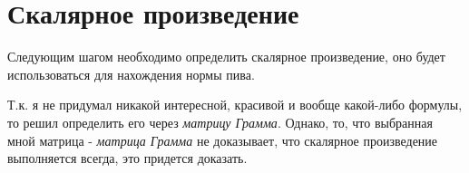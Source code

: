 \section*{Скалярное произведение}
Следующим шагом необходимо определить скалярное произведение, оно будет использоваться для нахождения нормы пива.

Т.к. я не придумал никакой интересной, красивой и вообще какой-либо формулы, то решил определить его через \textit{матрицу Грамма}. Однако, то, что выбранная мной матрица - \textit{матрица Грамма} не доказывает, что скалярное произведение выполняется всегда, это придется доказать.



